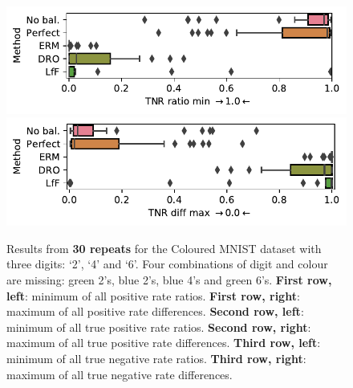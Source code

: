 \begin{figure}[htp]
  \includegraphics[width=\columnwidth]{figures/cmnist_3dig_4miss_tnrr-min.pdf}
  \includegraphics[width=\columnwidth]{figures/cmnist_3dig_4miss_tnrd-max.pdf}
  \caption{
    Results from \textbf{30 repeats} for the Coloured MNIST dataset with three digits: `2', `4' and `6'.
    Four combinations of digit and colour are missing: {\color{green}green} 2's, {\color{blue}blue} 2's, {\color{blue}blue} 4's and {\color{green}green} 6's.
    \textbf{First row, left}: minimum of all positive rate ratios.
    \textbf{First row, right}: maximum of all positive rate differences.
    \textbf{Second row, left}: minimum of all true positive rate ratios.
    \textbf{Second row, right}: maximum of all true positive rate differences.
    \textbf{Third row, left}: minimum of all true negative rate ratios.
    \textbf{Third row, right}: maximum of all true negative rate differences.
  }%
  \label{fig:cmnist-3dig-4miss-add}
\end{figure}
